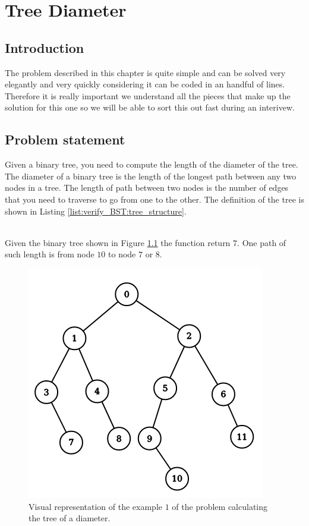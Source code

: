 %

\chapter{Tree Diameter}
\label{ch:tree_diameter}
\section*{Introduction}
The problem described in this chapter is quite simple and can be solved very elegantly and very quickly considering it can be coded in an handful of lines. Therefore it is really important we understand all the pieces that make up the solution for this one so we will be able to sort this out fast during an interivew.

\section{Problem statement}
\begin{exercise}
 Given a binary tree, you need to compute the length of the diameter of the tree. The diameter of a binary tree is the length of the longest path between any two nodes in a tree. The length of path between two nodes is  the number of edges that you need to traverse to go from one to the other.
 The definition of the tree is shown in Listing \ref{list:verify_BST:tree_structure}.


	\begin{example}
		\hfill \\
		Given the binary tree shown in Figure \ref{fig:tree_diameter:example1} the function return $7$. One path of such length is from node $10$ to node $7$ or $8$.
	\end{example}

\end{exercise}

\begin{figure}
	\centering
	\includegraphics[scale=0.6]{sources/tree_diameter/images/example1}
	\caption{Visual representation of the example $1$ of the problem calculating the tree of a diameter.}
	\label{fig:tree_diameter:example1}
\end{figure}


